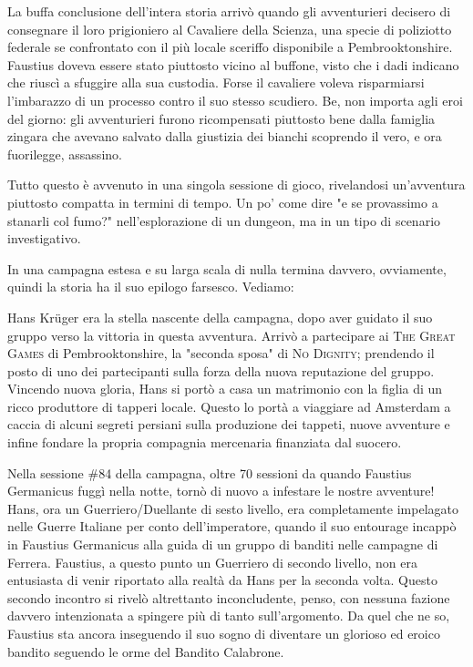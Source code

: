 La buffa conclusione dell'intera storia arrivò quando gli avventurieri decisero di consegnare il loro prigioniero al Cavaliere della Scienza, una specie di poliziotto federale se confrontato con il più locale sceriffo disponibile a Pembrooktonshire. Faustius doveva essere stato piuttosto vicino al buffone, visto che i dadi indicano che riuscì a sfuggire alla sua custodia. Forse il cavaliere voleva risparmiarsi l'imbarazzo di un processo contro il suo stesso scudiero. Be, non importa agli eroi del giorno: gli avventurieri furono ricompensati piuttosto bene dalla famiglia zingara che avevano salvato dalla giustizia dei bianchi scoprendo il vero, e ora fuorilegge, assassino.

Tutto questo è avvenuto in una singola sessione di gioco, rivelandosi un'avventura piuttosto compatta in termini di tempo. Un po' come dire "e se provassimo a stanarli col fumo?" nell'esplorazione di un dungeon, ma in un tipo di scenario investigativo.

In una campagna estesa e su larga scala di \dnd nulla termina davvero, ovviamente, quindi la storia ha il suo epilogo farsesco. Vediamo:

Hans Krüger era la stella nascente della campagna, dopo aver guidato il suo gruppo verso la vittoria in questa avventura. Arrivò a partecipare ai \textsc{The Great Games} di Pembrooktonshire, la "seconda sposa" di \textsc{No Dignity}; prendendo il posto di uno dei partecipanti sulla forza della nuova reputazione del gruppo. Vincendo nuova gloria, Hans si portò a casa un matrimonio con la figlia di un ricco produttore di tapperi locale. Questo lo portà a viaggiare ad Amsterdam a caccia di alcuni segreti persiani sulla produzione dei tappeti, nuove avventure e infine fondare la propria compagnia mercenaria finanziata dal suocero.

Nella sessione \#84 della campagna, oltre 70 sessioni da quando Faustius Germanicus fuggì nella notte, tornò di nuovo a infestare le nostre avventure! Hans, ora un Guerriero/Duellante di sesto livello, era completamente impelagato nelle Guerre Italiane per conto dell'imperatore, quando il suo entourage incappò in Faustius Germanicus alla guida di un gruppo di banditi nelle campagne di Ferrera. Faustius, a questo punto un Guerriero di secondo livello, non era entusiasta di venir riportato alla realtà da Hans per la seconda volta. Questo secondo incontro si rivelò altrettanto inconcludente, penso, con nessuna fazione davvero intenzionata a spingere più di tanto sull'argomento. Da quel che ne so, Faustius sta ancora inseguendo il suo sogno di diventare un glorioso ed eroico bandito seguendo le orme del Bandito Calabrone.